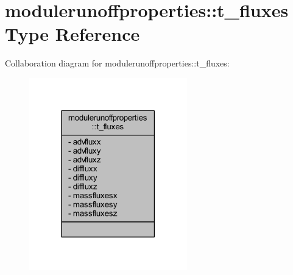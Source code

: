 \hypertarget{structmodulerunoffproperties_1_1t__fluxes}{}\section{modulerunoffproperties\+:\+:t\+\_\+fluxes Type Reference}
\label{structmodulerunoffproperties_1_1t__fluxes}


Collaboration diagram for modulerunoffproperties\+:\+:t\+\_\+fluxes\+:\nopagebreak
\begin{figure}[H]
\begin{center}
\leavevmode
\includegraphics[width=194pt]{structmodulerunoffproperties_1_1t__fluxes__coll__graph}
\end{center}
\end{figure}
